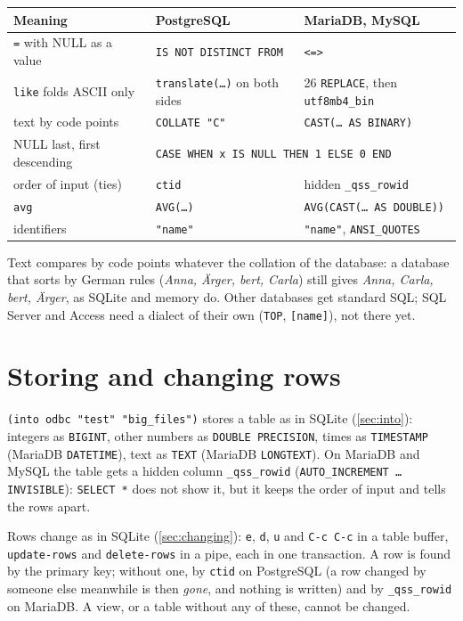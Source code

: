 \documentclass[
  paper=a4, fontsize=11pt, parskip=half, headings=small,
  toc=bibliography, numbers=noenddot, DIV=12
]{scrreprt}
\newcommand{\code}[1]{\texttt{#1}}
\newcommand{\kbd}[1]{\texttt{#1}}
\begin{document}
\noindent\begin{tabularx}{\linewidth}{@{}lXX@{}}
\toprule
\textbf{Meaning} & \textbf{PostgreSQL} & \textbf{MariaDB, MySQL} \\
\midrule
\code{=} with NULL as a value & \code{IS NOT DISTINCT FROM} & \code{<=>} \\
\code{like} folds ASCII only & \code{translate(\ldots)} on both sides &
  26 \code{REPLACE}, then \code{utf8mb4\_bin} \\
text by code points & \code{COLLATE "C"} & \code{CAST(\ldots{} AS BINARY)} \\
NULL last, first descending & \multicolumn{2}{l}{\code{CASE WHEN x IS NULL THEN 1 ELSE 0 END}} \\
order of input (ties) & \code{ctid} & hidden \code{\_qss\_rowid} \\
\code{avg} & \code{AVG(\ldots)} & \code{AVG(CAST(\ldots{} AS DOUBLE))} \\
identifiers & \code{"name"} & \code{"name"}, \code{ANSI\_QUOTES} \\
\bottomrule
\end{tabularx}

\medskip
Text compares by code points whatever the collation of the database: a
database that sorts by German rules (\emph{Anna, Ärger, bert, Carla}) still
gives \emph{Anna, Carla, bert, Ärger}, as SQLite and memory do. Other
databases get standard SQL; SQL Server and Access need a dialect of their own
(\code{TOP}, \code{[name]}), not there yet.

\section{Storing and changing rows}

\code{(into odbc "test" "big\_files")} stores a table as in SQLite
(\ref{sec:into}): integers as \code{BIGINT}, other numbers as \code{DOUBLE
PRECISION}, times as \code{TIMESTAMP} (MariaDB \code{DATETIME}), text as
\code{TEXT} (MariaDB \code{LONGTEXT}). On MariaDB and MySQL the table gets a
hidden column \code{\_qss\_rowid} (\code{AUTO\_INCREMENT \ldots{} INVISIBLE}):
\code{SELECT *} does not show it, but it keeps the order of input and tells
the rows apart.

Rows change as in SQLite (\ref{sec:changing}): \kbd{e}, \kbd{d}, \kbd{u} and
\kbd{C-c C-c} in a table buffer, \code{update-rows} and \code{delete-rows} in
a pipe, each in one transaction. A row is found by the primary key; without
one, by \code{ctid} on PostgreSQL (a row changed by someone else meanwhile is
then \emph{gone}, and nothing is written) and by \code{\_qss\_rowid} on
MariaDB. A view, or a table without any of these, cannot be changed.
\end{document}
